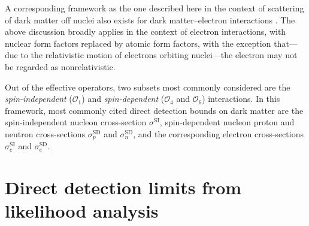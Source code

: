 \documentclass[b5paper, 10pt, twoside]{book}
\begin{document}
A corresponding framework as the one described here in the context of scattering of dark matter off nuclei also exists for dark matter--electron interactions \parencites{CatenaEtAl2020, CatenaEtAl2021}. The above discussion broadly applies in the context of electron interactions, with nuclear form factors replaced by atomic form factors, with the exception that---due to the relativistic motion of electrons orbiting nuclei---the electron may not be regarded as nonrelativistic.

Out of the effective operators, two subsets most commonly considered are the \emph{spin-independent} ($\mathcal{O_1}$) and \emph{spin-dependent} ($\mathcal{O}_4$ and $\mathcal{O}_6$) interactions. In this framework, most commonly cited direct detection bounds on dark matter are the spin-independent nucleon cross-section $\sigma^\text{SI}$, spin-dependent nucleon proton and neutron cross-sections $\sigma_p^\text{SD}$ and $\sigma_n^\text{SD}$, and the corresponding electron cross-sections $\sigma_e^\text{SI}$ and $\sigma_e^\text{SD}$.

\section{Direct detection limits from likelihood analysis}
\end{document}
